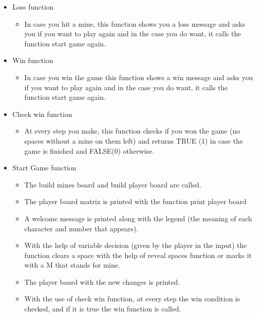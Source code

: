 \documentclass{article}
\begin{document}
\begin{itemize}
   \item Loss function
        \begin{itemize}
            \item In case you hit a mine, this function shows you a loss message and asks you if you want to play again and in the case you do want, it calls the function start game again.
        \end{itemize}
   
   \item Win function 
        \begin{itemize}
            \item In case you win the game this function shows a win message and asks you if you want to play again and in the case you do want, it calls the function start game again.
        \end{itemize}
   
   \item Check win function 
        \begin{itemize}
            \item At every step you make, this function checks if you won the game (no spaces without a mine on them left) and returns TRUE (1) in case the game is finished and FALSE(0) otherwise.
        \end{itemize}
   
   \item Start Game function
        \begin{itemize} 
            \item The build mines board and build player board are called.
            \item The player board matrix is printed with the function print player board
            \item A welcome message is printed along with the legend (the meaning of each character and number that appears).
            \item With the help of  variable decision (given by the player in the input) the function clears a space with the help of reveal spaces function or marks it with a M that stands for mine.
            \item The player board with the new changes is printed.
            \item With the use of check win function, at every step the win condition is checked, and if it is true the win function is called.
        \end{itemize}
     
   
       

\end{itemize}
\end{document}
